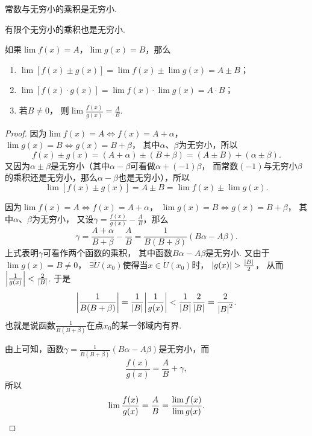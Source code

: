 \begin{corollary}
常数与无穷小的乘积是无穷小.
\end{corollary}

\begin{corollary}
有限个无穷小的乘积也是无穷小.
\end{corollary}

\begin{theorem}\label{theorem:极限.极限的四则运算法则}
如果\(\lim f(x)=A\)，\(\lim g(x)=B\)，那么\begin{enumerate}
	\item \(\lim [f(x) \pm g(x)] = \lim f(x) \pm \lim g(x) = A \pm B\)；
	\item \(\lim [f(x) \cdot g(x)] = \lim f(x) \cdot \lim g(x) = A \cdot B\)；
	\item 若\(B\neq0\)，
	则\(\lim \frac{f(x)}{g(x)} = \frac{A}{B}\).
\end{enumerate}
\begin{proof}
因为\(\lim f(x)=A \iff f(x)=A+\alpha\)，\(\lim g(x)=B \iff g(x)=B+\beta\)，
其中\(\alpha\)、\(\beta\)为无穷小，所以\[
	f(x) \pm g(x) = (A+\alpha)\pm(B+\beta) = (A \pm B) + (\alpha \pm \beta).
\]
又因为\(\alpha\pm\beta\)是无穷小（其中\(\alpha-\beta\)可看做\(\alpha+(-1)\beta\)，
而常数\((-1)\)与无穷小\(\beta\)的乘积还是无穷小，那么\(\alpha-\beta\)也是无穷小），所以\[
	\lim [f(x) \pm g(x)] = A \pm B = \lim f(x) \pm \lim g(x).
\]

因为\(\lim f(x)=A \iff f(x)=A+\alpha\)，
\(\lim g(x)=B \iff g(x)=B+\beta\)，
其中\(\alpha\)、\(\beta\)为无穷小，
又设\(\gamma = \frac{f(x)}{g(x)} - \frac{A}{B}\)，那么\[
	\gamma = \frac{A+\alpha}{B+\beta} - \frac{A}{B}
	= \frac{1}{B(B+\beta)} (B \alpha - A \beta).
\]
上式表明\(\gamma\)可看作两个函数的乘积，
其中函数\(B \alpha - A \beta\)是无穷小.
又由于\(\lim g(x) = B \neq 0\)，
\(\exists \mathring{U}(x_0)\)使得当\(x\in\mathring{U}(x_0)\)时，
\(\abs{g(x)}>\frac{\abs{B}}{2}\)，
从而\(\abs{\frac{1}{g(x)}}<\frac{2}{\abs{B}}\).
于是\[
	\abs{\frac{1}{B(B+\beta)}}
	=\frac{1}{\abs{B}} \abs{\frac{1}{g(x)}}
	<\frac{1}{\abs{B}} \frac{2}{\abs{B}}
	=\frac{2}{\abs{B}^2}.
\]
也就是说函数\(\frac{1}{B(B+\beta)}\)在点\(x_0\)的某一邻域内有界.

由上可知，函数\(\gamma = \frac{1}{B(B+\beta)} (B \alpha - A \beta)\)是无穷小，而\[
\frac{f(x)}{g(x)} = \frac{A}{B} + \gamma,
\]所以\[
\lim\frac{f(x)}{g(x)} = \frac{A}{B} = \frac{\lim f(x)}{\lim g(x)}.
\qedhere
\]
\end{proof}
\end{theorem}

